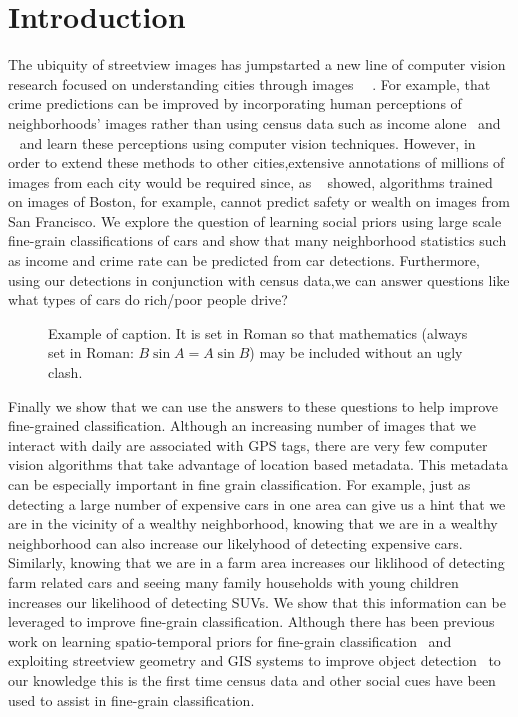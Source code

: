 \documentclass[10pt,twocolumn,letterpaper]{article}
\begin{document}
\section{Introduction}
The ubiquity of streetview images has jumpstarted a new line of computer vision research focused on understanding cities through images \cite{mit_plos_1}~\cite{MIT_vision}~\cite{tamara}. For example, \cite{mit_plos_1} that crime predictions can be improved by incorporating human perceptions of neighborhoods' images rather than using census data such as income alone~\cite{mit_plos_1} and ~\cite{tamara} and \cite{MIT_vision} learn these perceptions using computer vision techniques. However, in order to extend these methods to other cities,extensive annotations of millions of images from each city would be required since, as ~\cite{tamara} showed, algorithms trained on images of Boston, for example, cannot predict safety or wealth on images from San Francisco.  We explore the question of learning social priors using large scale fine-grain classifications of cars and show that many neighborhood statistics such as income and crime rate can be predicted from car detections. Furthermore, using our detections in conjunction with census data,we can answer questions like what types of cars do rich/poor people drive? 

\begin{figure}[t]
\begin{center}
\fbox{\rule{0pt}{2in} \rule{0.9\linewidth}{0pt}}
\end{center}
   \caption{Example of caption.  It is set in Roman so that mathematics
   (always set in Roman: $B \sin A = A \sin B$) may be included without an
   ugly clash.}
\label{fig:pull}
\end{figure}

Finally we show that we can use the answers to these questions to help improve fine-grained classification. Although an increasing number of images that we interact with daily are associated with GPS tags, there are very few computer vision algorithms that take advantage of location based metadata. This metadata can be especially important in fine grain classification. For example, just as detecting a large number of expensive cars in one area can give us a hint that we are in the vicinity of a wealthy neighborhood, knowing that we are in a wealthy neighborhood can also increase our likelyhood of detecting expensive cars. Similarly, knowing that we are in a farm area increases our liklihood of detecting farm related cars and seeing many family households with young children increases our likelihood of detecting SUVs. We show that this information can be leveraged to improve fine-grain classification. Although there has been previous work on learning spatio-temporal priors for fine-grain classification~\cite{birdsnap} and exploiting streetview geometry and GIS systems to improve object detection~\cite{nyc3D,amir} to our knowledge this is the first time census data and other social cues have been used to assist in fine-grain classification.  
\end{document}
